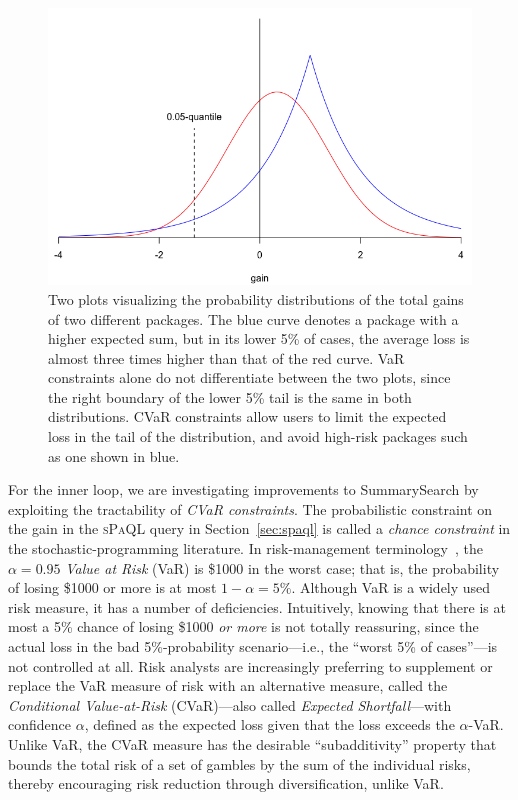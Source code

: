 \documentclass[11pt]{article}
\newcommand{\spaql}{\textsc{sPaQL}\xspace}
\newcommand{\subsearch}{{\sc SummarySearch}\xspace}
\begin{document}
\begin{figure}
    \centering
    \includegraphics[scale=0.3]{figs/CVARexample.png}
    \caption{Two plots visualizing the probability distributions of the total gains of two different packages. The blue curve denotes a package with a higher expected sum, but in its lower 5\% of cases, the average loss is almost three times higher than that of the red curve. VaR constraints alone do not differentiate between the two plots, since the right boundary of the lower 5\% tail is the same in both distributions. CVaR constraints allow users to limit the expected loss in the tail of the distribution, and avoid high-risk packages such as one shown in blue.}
    \label{fig:cvar_motivation}
\end{figure}
For the inner loop, we are investigating improvements to \subsearch by exploiting the tractability of \emph{CVaR constraints}. 
The probabilistic constraint on the gain in the \spaql query in Section~\ref{sec:spaql} is called a \emph{chance constraint} in the stochastic-programming literature. In risk-management terminology~\cite{McNeilFE15}, the $\alpha=0.95$ \emph{Value at Risk} (VaR) is \$1000 in the worst case; that is, the probability of losing \$1000 or more is at most $1-\alpha=5\%$. Although VaR is a widely used risk measure, it has a number of deficiencies. Intuitively, knowing that there is at most a 5\% chance of losing \$1000 \emph{or more} is not totally reassuring, since the actual loss in the bad 5\%-probability scenario---i.e., the ``worst 5\% of cases''---is not controlled at all. Risk analysts are increasingly preferring to supplement or replace the VaR measure of risk with an alternative measure, called the \emph{Conditional Value-at-Risk} (CVaR)---also called \emph{Expected Shortfall}---with confidence $\alpha$, defined as the expected loss given that the loss exceeds the $\alpha$-VaR. Unlike VaR, the CVaR measure has the desirable ``subadditivity'' property that bounds the total risk of a set of gambles by the sum of the individual risks, thereby encouraging risk reduction through diversification, unlike VaR.
\end{document}
